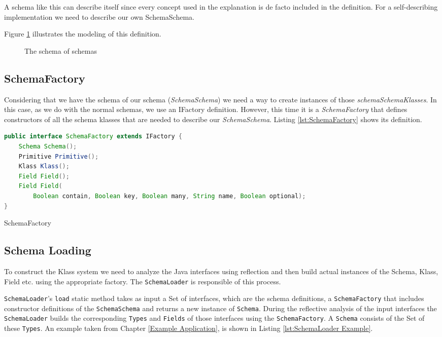 A schema like this can describe itself since every concept used in the explanation is de facto included in the definition.
For a self-describing implementation we need to describe our own SchemaSchema. 

Figure \ref{fig:SchemaSchema_definition} illustrates the modeling of this definition.

\begin{figure}[H]
	\centering
  	\caption{The schema of schemas}
  	\label{fig:SchemaSchema_definition}
\end{figure}

\subsection{SchemaFactory}\label{sec:SchemaFactory}
Considering that we have the schema of our schema (\textit{SchemaSchema}) we need a way to create instances of those \textit{schemaSchemaKlasses}.
In this case, as we do with the normal schemas, we use an IFactory definition.
However, this time it is a \textit{SchemaFactory} that defines constructors of all the schema klasses that are needed to describe our \textit{SchemaSchema}.
Listing \ref{lst:SchemaFactory} shows its definition.

\begin{sourcecode} [H]
	\begin{lstlisting}[language=Java, escapechar=|]
public interface SchemaFactory extends IFactory {
    Schema Schema();
    Primitive Primitive();
    Klass Klass();
    Field Field();
    Field Field(
    	Boolean contain, Boolean key, Boolean many, String name, Boolean optional);
}
	\end{lstlisting}
	\caption{SchemaFactory}
	\label{lst:SchemaFactory}
\end{sourcecode}

\subsection{Schema Loading}\label{sec:Schema Loading}
To construct the Klass system we need to analyze the Java interfaces using reflection and then build actual instances of the Schema, Klass, Field etc. using the appropriate factory.
The \texttt{SchemaLoader} is responsible of this process.

\texttt{SchemaLoader}'s \texttt{load} static method takes as input a Set of interfaces, which are the schema definitions, a \texttt{SchemaFactory} that includes constructor definitions of the \texttt{SchemaSchema} and returns a new instance of \texttt{Schema}.
During the reflective analysis of the input interfaces the \texttt{SchemaLoader} builds the corresponding \texttt{Types} and \texttt{Fields} of those interfaces using the \texttt{SchemaFactory}.
A \texttt{Schema} consists of the Set of these \texttt{Types}.
An example taken from Chapter \ref{Example Application}, is shown in Listing \ref{lst:SchemaLoader Example}.

